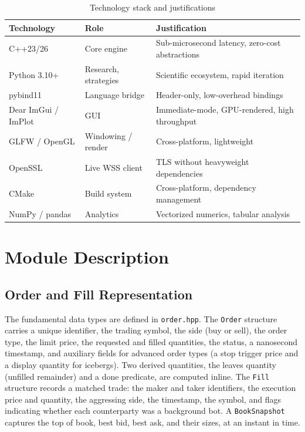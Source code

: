 \documentclass[12pt,oneside,a4paper]{report}
\begin{document}
\begin{table}[H]
\centering
\caption{Technology stack and justifications}
\label{tab:tech}
\small
\begin{tabular}{p{1.4in}p{1.4in}p{2.3in}}
\toprule
\textbf{Technology} & \textbf{Role} & \textbf{Justification} \\
\midrule
C++23/26 & Core engine & Sub-microsecond latency, zero-cost abstractions \\
Python 3.10+ & Research, strategies & Scientific ecosystem, rapid iteration \\
pybind11 & Language bridge & Header-only, low-overhead bindings \\
Dear ImGui / ImPlot & GUI & Immediate-mode, GPU-rendered, high throughput \\
GLFW / OpenGL & Windowing / render & Cross-platform, lightweight \\
OpenSSL & Live WSS client & TLS without heavyweight dependencies \\
CMake & Build system & Cross-platform, dependency management \\
NumPy / pandas & Analytics & Vectorized numerics, tabular analysis \\
\bottomrule
\end{tabular}
\end{table}

\section{Module Description}
\label{sec:modules}

\subsection{Order and Fill Representation}

The fundamental data types are defined in \texttt{order.hpp}. The \texttt{Order} structure carries a unique identifier, the trading symbol, the side (buy or sell), the order type, the limit price, the requested and filled quantities, the status, a nanosecond timestamp, and auxiliary fields for advanced order types (a stop trigger price and a display quantity for icebergs). Two derived quantities, the leaves quantity (unfilled remainder) and a done predicate, are computed inline. The \texttt{Fill} structure records a matched trade: the maker and taker identifiers, the execution price and quantity, the aggressing side, the timestamp, the symbol, and flags indicating whether each counterparty was a background bot. A \texttt{BookSnapshot} captures the top of book, best bid, best ask, and their sizes, at an instant in time.
\end{document}
